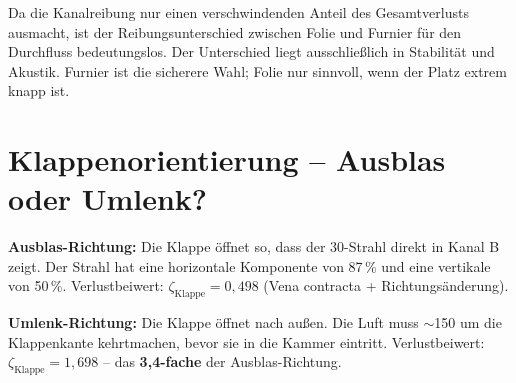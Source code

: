 \documentclass[11pt,a4paper]{article}
\begin{document}
\begin{table}[H]
\centering\small
{}
\caption{Folie vs.\ Furnier als Trennwandmaterial}
\end{table}

Da die Kanalreibung nur einen verschwindenden Anteil des Gesamtverlusts ausmacht, ist der Reibungsunterschied zwischen Folie und Furnier für den Durchfluss bedeutungslos. Der Unterschied liegt ausschließlich in Stabilität und Akustik. Furnier ist die sicherere Wahl; Folie nur sinnvoll, wenn der Platz extrem knapp ist.

\section{Klappenorientierung -- Ausblas oder Umlenk?}

\textbf{Ausblas-Richtung:} Die Klappe öffnet so, dass der 30\textdegree{}-Strahl direkt in Kanal B zeigt. Der Strahl hat eine horizontale Komponente von 87\,\% und eine vertikale von 50\,\%. Verlustbeiwert: $\zeta_\text{Klappe} = 0{,}498$ (Vena contracta + Richtungsänderung).

\textbf{Umlenk-Richtung:} Die Klappe öffnet nach außen. Die Luft muss $\sim$150\textdegree{} um die Klappenkante kehrtmachen, bevor sie in die Kammer eintritt. Verlustbeiwert: $\zeta_\text{Klappe} = 1{,}698$ -- das \textbf{3{,}4-fache} der Ausblas-Richtung.

\begin{table}[H]
\centering\small
{}
\caption{Vergleich Ausblas vs.\ Umlenk-Klappenorientierung}
\end{table}
\end{document}
